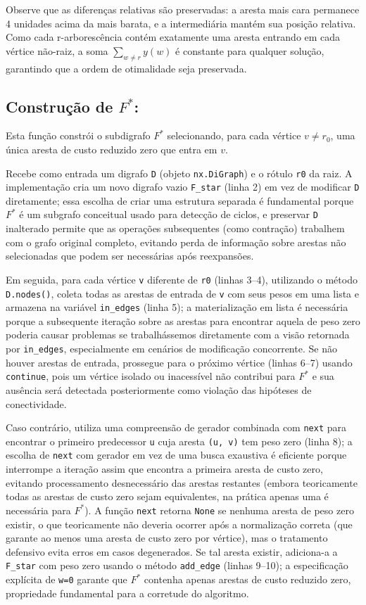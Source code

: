 Observe que as diferenças relativas são preservadas: a aresta mais cara permanece 4 unidades acima da mais barata, e a intermediária mantém sua posição relativa. Como cada r-arborescência contém exatamente uma aresta entrando em cada vértice não-raiz, a soma \(\sum_{w\neq r} y(w)\) é constante para qualquer solução, garantindo que a ordem de otimalidade seja preservada.

\subsection{Construção de \texorpdfstring{\(F^*\)}{F*}:}
Esta função constrói o subdigrafo \(F^*\) selecionando, para cada vértice \(v\neq r_0\), uma única aresta de custo reduzido zero que entra em \(v\).

Recebe como entrada um digrafo \texttt{D} (objeto \texttt{nx.DiGraph}) e o rótulo \texttt{r0} da raiz. A implementação cria um novo digrafo vazio \texttt{F\_star} (linha 2) em vez de modificar \texttt{D} diretamente; essa escolha de criar uma estrutura separada é fundamental porque \(F^*\) é um subgrafo conceitual usado para detecção de ciclos, e preservar \texttt{D} inalterado permite que as operações subsequentes (como contração) trabalhem com o grafo original completo, evitando perda de informação sobre arestas não selecionadas que podem ser necessárias após reexpansões.

Em seguida, para cada vértice \texttt{v} diferente de \texttt{r0} (linhas 3--4), utilizando o método \texttt{D.nodes()}, coleta todas as arestas de entrada de \texttt{v} com seus pesos em uma lista e armazena na variável \texttt{in\_edges} (linha 5); a materialização em lista é necessária porque a subsequente iteração sobre as arestas para encontrar aquela de peso zero poderia causar problemas se trabalhássemos diretamente com a visão retornada por \texttt{in\_edges}, especialmente em cenários de modificação concorrente. Se não houver arestas de entrada, prossegue para o próximo vértice (linhas 6--7) usando \texttt{continue}, pois um vértice isolado ou inacessível não contribui para \(F^*\) e sua ausência será detectada posteriormente como violação das hipóteses de conectividade.

Caso contrário, utiliza uma compreensão de gerador combinada com \texttt{next} para encontrar o primeiro predecessor \texttt{u} cuja aresta \texttt{(u, v)} tem peso zero (linha 8); a escolha de \texttt{next} com gerador em vez de uma busca exaustiva é eficiente porque interrompe a iteração assim que encontra a primeira aresta de custo zero, evitando processamento desnecessário das arestas restantes (embora teoricamente todas as arestas de custo zero sejam equivalentes, na prática apenas uma é necessária para \(F^*\)). A função \texttt{next} retorna \texttt{None} se nenhuma aresta de peso zero existir, o que teoricamente não deveria ocorrer após a normalização correta (que garante ao menos uma aresta de custo zero por vértice), mas o tratamento defensivo evita erros em casos degenerados. Se tal aresta existir, adiciona-a a \texttt{F\_star} com peso zero usando o método \texttt{add\_edge} (linhas 9--10); a especificação explícita de \texttt{w=0} garante que \(F^*\) contenha apenas arestas de custo reduzido zero, propriedade fundamental para a corretude do algoritmo.

